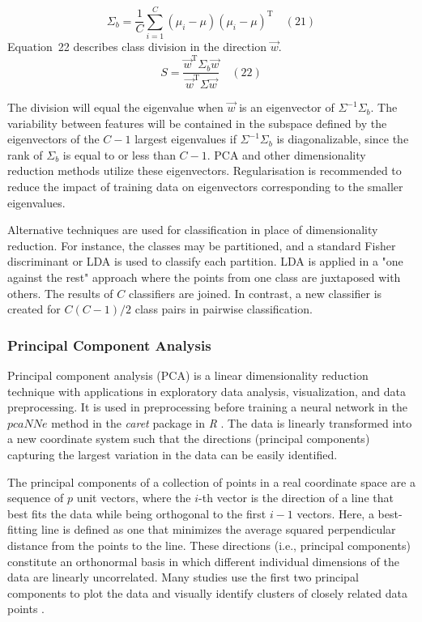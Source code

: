 \documentclass[preprint,12pt]{elsarticle}
\begin{document}
\begin{equation}
	\Sigma_{b}={\frac{1}{C}}\sum_{i=1}^{C}\left(\mu_{i}-\mu\right)\left(\mu_{i}-\mu\right)^{\mathrm{T}}
	\quad\left(21\right)
\end{equation}
Equation~22 describes class division in the direction $\vec{w}$.
\begin{equation}
	S={\frac{{\vec{w}}^{\mathrm{T}}\Sigma_{b}{\vec{w}}}{{\vec{w}}^{\mathrm{T}}\Sigma {\vec{w}}}}
	\quad\left(22\right)
\end{equation}

The division will equal the eigenvalue when $\vec{w}$ is an eigenvector of $\Sigma ^{-1}\Sigma_{b}$. The variability between features will be contained in the subspace defined by the eigenvectors of the $C - 1$ largest eigenvalues if $\Sigma ^{-1}\Sigma_{b}$ is diagonalizable, since the rank of $\Sigma_{b}$ is equal to or less than $C - 1$. PCA and other dimensionality reduction methods utilize these eigenvectors. Regularisation is recommended to reduce the impact of training data on eigenvectors corresponding to the smaller eigenvalues.

Alternative techniques are used for classification in place of dimensionality reduction. For instance, the classes may be partitioned, and a standard Fisher discriminant or LDA is used to classify each partition. LDA is applied in a "one against the rest" approach where the points from one class are juxtaposed with others. The results of $C$ classifiers are joined. In contrast, a new classifier is created for $ C(C - 1)/2$ class pairs in pairwise classification.

\subsubsection{Principal Component Analysis}

Principal component analysis (PCA) is a linear dimensionality reduction technique with applications in exploratory data analysis, visualization, and data preprocessing. It is used in preprocessing before training a neural network in the $pcaNNe$ method in the \textit{caret} package in \textit{R} \cite{ripley2007pattern}. The data is linearly transformed into a new coordinate system such that the directions (principal components) capturing the largest variation in the data can be easily identified.

The principal components of a collection of points in a real coordinate space are a sequence of $p$ unit vectors, where the $i$-th vector is the direction of a line that best fits the data while being orthogonal to the first $i-1$ vectors. Here, a best-fitting line is defined as one that minimizes the average squared perpendicular distance from the points to the line. These directions (i.e., principal components) constitute an orthonormal basis in which different individual dimensions of the data are linearly uncorrelated. Many studies use the first two principal components to plot the data and visually identify clusters of closely related data points \cite{jolliffe2016principal}.
\end{document}

